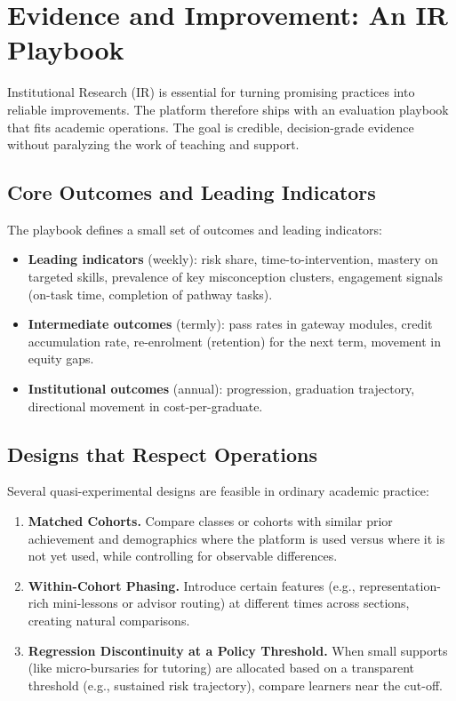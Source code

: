 \section{Evidence and Improvement: An IR Playbook}
\label{sec:evidence}

Institutional Research (IR) is essential for turning promising practices into reliable improvements. The platform therefore ships with an evaluation playbook that fits academic operations. The goal is credible, decision-grade evidence without paralyzing the work of teaching and support.

\subsection{Core Outcomes and Leading Indicators}

The playbook defines a small set of outcomes and leading indicators:
\begin{itemize}
  \item \textbf{Leading indicators} (weekly): risk share, time-to-intervention, mastery on targeted skills, prevalence of key misconception clusters, engagement signals (on-task time, completion of pathway tasks).
  \item \textbf{Intermediate outcomes} (termly): pass rates in gateway modules, credit accumulation rate, re-enrolment (retention) for the next term, movement in equity gaps.
  \item \textbf{Institutional outcomes} (annual): progression, graduation trajectory, directional movement in cost-per-graduate.
\end{itemize}

\subsection{Designs that Respect Operations}

Several quasi-experimental designs are feasible in ordinary academic practice:
\begin{enumerate}
  \item \textbf{Matched Cohorts.} Compare classes or cohorts with similar prior achievement and demographics where the platform is used versus where it is not yet used, while controlling for observable differences.
  \item \textbf{Within-Cohort Phasing.} Introduce certain features (e.g., representation-rich mini-lessons or advisor routing) at different times across sections, creating natural comparisons.
  \item \textbf{Regression Discontinuity at a Policy Threshold.} When small supports (like micro-bursaries for tutoring) are allocated based on a transparent threshold (e.g., sustained risk trajectory), compare learners near the cut-off.
\end{enumerate}


